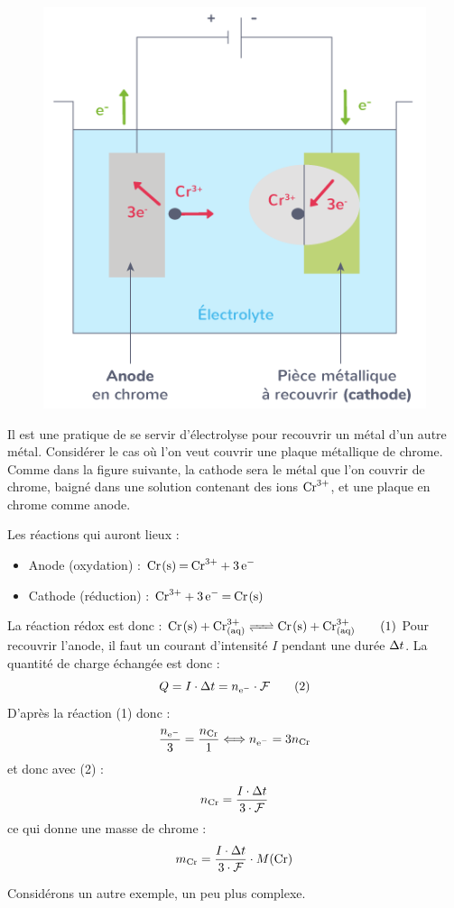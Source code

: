 \documentclass[11pt,a4paper]{article}
\begin{document}
\begin{eg}

\begin{figure}
\centering
\includegraphics[width=0.95\linewidth]{imgs/c6/chrome.png}
\end{figure}

Il est une pratique de se servir d'électrolyse pour recouvrir un métal d'un autre métal. Considérer le cas où l'on veut couvrir une plaque métallique de chrome. Comme dans la figure suivante, la cathode sera le métal que l'on couvrir de chrome, baigné dans une solution contenant des ions $\ce{Cr^3+}$, et une plaque en chrome comme anode. 

Les réactions qui auront lieux : 
\begin{itemize}
    \item Anode (oxydation) : $\ce{Cr_(s) = Cr^3+ + 3 e-}$
    \item Cathode (réduction) : $\ce{Cr^3+ + 3 e- = Cr_(s)}$
\end{itemize}
La réaction rédox est donc : $\ce{Cr_(s) + Cr^3+_{(aq)} <=> Cr_(s) + Cr^3+_{(aq)}} \tag{1}$
Pour recouvrir l'anode, il faut un courant d'intensité $I$ pendant une durée $\Delta t$. La quantité de charge échangée est donc : 
\[ Q = I\cdot\Dt = n_{\ce{e-}}\cdot\mathcal{F} \tag{2}\]
D'après la réaction (1) donc : 
\[ \dfrac{n_{\ce{e-}}}{3} = \dfrac{n_{\ce{Cr}}}{1} \Longleftrightarrow n_{\ce{e-}} = 3 n_{\ce{Cr}}  \]
et donc avec (2) : 
\[ n_{\ce{Cr}} = \dfrac{I\cdot\Dt}{3\cdot\mathcal{F}}\]
ce qui donne une masse de chrome : 
\[ m_{\ce{Cr}} = \dfrac{I\cdot\Dt}{3\cdot\mathcal{F}}\cdot M(\ce{Cr})\]
\end{eg}
Considérons un autre exemple, un peu plus complexe. 
\end{document}
